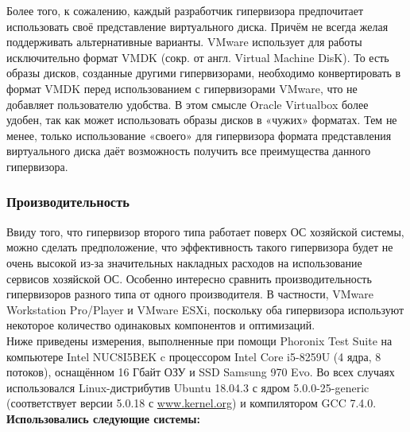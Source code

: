 \documentclass[14pt, a4paper]{article}
\begin{document}
Более того, к сожалению, каждый разработчик гипервизора предпочитает использовать своё
представление виртуального диска. Причём не всегда желая поддерживать альтернативные
варианты. VMware использует для работы исключительно формат VMDK (сокр. от англ. Virtual Machine
DisK). То есть образы дисков, созданные другими гипервизорами, необходимо конвертировать в
формат VMDK перед использованием с гипервизорами VMware, что не добавляет пользователю
удобства. В этом смысле Oracle Virtualbox более удобен, так как может использовать образы дисков в
«чужих» форматах. Тем не менее, только использование «своего» для гипервизора формата
представления виртуального диска даёт возможность получить все преимущества данного
гипервизора.

\subsubsection*{Производительность}

Ввиду того, что гипервизор второго типа работает поверх ОС хозяйской системы, можно сделать
предположение, что эффективность такого гипервизора будет не очень высокой из-за значительных
накладных расходов на использование сервисов хозяйской ОС. Особенно интересно сравнить
производительность гипервизоров разного типа от одного производителя. В частности, VMware
Workstation Pro/Player и VMware ESXi, поскольку оба гипервизора используют некоторое количество
одинаковых компонентов и оптимизаций.\\

Ниже приведены измерения, выполненные при помощи Phoronix Test Suite на компьютере Intel
NUC8I5BEK c процессором Intel Core i5-8259U (4 ядра, 8 потоков), оснащённом 16 Гбайт ОЗУ и SSD
Samsung 970 Evo. Во всех случаях использовался Linux-дистрибутив Ubuntu 18.04.3 с ядром
5.0.0-25-generic (соответствует версии 5.0.18 с \href{www.kernel.org}{www.kernel.org}) и компилятором GCC 7.4.0.\\

\textbf{Использовались следующие системы:}
\end{document}
